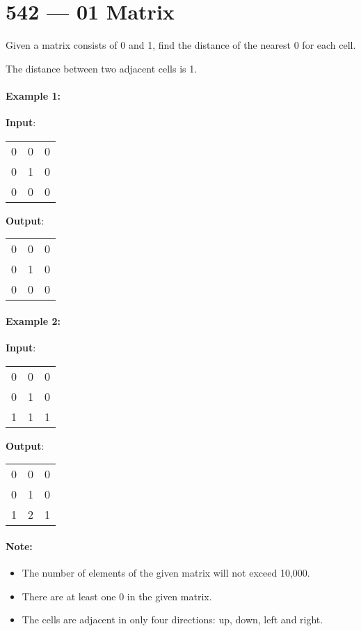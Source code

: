 \section{542 --- 01 Matrix}
Given a matrix consists of 0 and 1, find the distance of the nearest 0 for each cell.

The distance between two adjacent cells is 1.
 

\paragraph{Example 1:}

\begin{flushleft}
\textbf{Input}:
\begin{table}[H]
\begin{tabular}{ccc}
0 & 0 & 0\\
0 & 1 & 0\\
0 & 0 & 0
\end{tabular}
\end{table}


\textbf{Output}:
\begin{table}[H]
\begin{tabular}{ccc}
0 & 0 & 0\\
0 & 1 & 0\\
0 & 0 & 0
\end{tabular}
\end{table}
\end{flushleft}

\paragraph{Example 2:}

\begin{flushleft}
\textbf{Input}:
\begin{table}[H]
\begin{tabular}{ccc}
0 & 0 & 0\\
0 & 1 & 0\\
1 & 1 & 1
\end{tabular}
\end{table}

\textbf{Output}:
\begin{table}[H]
\begin{tabular}{ccc}
0 & 0 & 0\\
0 & 1 & 0\\
1 & 2 & 1
\end{tabular}
\end{table}
\end{flushleft}
 

\paragraph{Note:}

\begin{itemize}
\item The number of elements of the given matrix will not exceed 10,000.
\item There are at least one 0 in the given matrix.
\item The cells are adjacent in only four directions: up, down, left and right.
\end{itemize}


